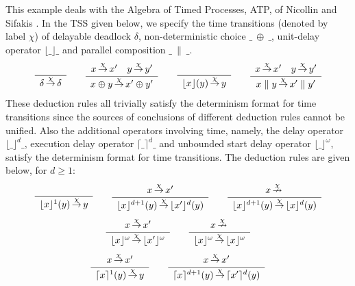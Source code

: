 \begin{example}\label{ex:timetrans1}
This example deals with the Algebra of Timed Processes, ATP, of Nicollin and Sifakis \cite{Nicollin94}.
In the TSS given below, we specify the time transitions (denoted by label $\chi$) of delayable deadlock $\delta$,
non-deterministic choice $\_~\oplus~\_$, unit-delay operator $\lfloor\_\rfloor\_$ and parallel composition $\_~\parallel~\_$.
\[
\sosrule{}{\delta \trans{\chi} \delta}
\qquad
\sosrule{x \trans{\chi} x' \quad y \trans{\chi} y'}{x \oplus y \trans{\chi} x' \oplus y'}
\qquad
\sosrule{}{\lfloor x \rfloor (y) \trans{\chi} y}
\qquad
\sosrule{x \trans{\chi} x' \quad y \trans{\chi} y'}{x \parallel y \trans{\chi} x' \parallel y'}
\]
These deduction rules all trivially satisfy the determinism format for time transitions since the sources of conclusions of different deduction rules cannot be unified. Also the additional operators involving time, namely, the delay operator $\lfloor \_ \rfloor^{d}\_$, execution delay operator
$\lceil \_ \rceil^{d}\_$ and unbounded start delay operator $\lfloor \_ \rfloor^{\omega}$, satisfy the determinism format for time transitions. The deduction rules are given below, for $d \geq 1$:
\[
\sosrule{}{\lfloor x \rfloor^1(y) \trans{\chi} y}
\qquad
\sosrule{x \trans{\chi} x'}{\lfloor x \rfloor^{d+1} (y) \trans{\chi} \lfloor x' \rfloor^{d}(y)}
\qquad
\sosrule{x \ntrans{\chi}}{\lfloor x \rfloor^{d+1} (y) \trans{\chi} \lfloor x \rfloor^{d}(y)}
\]
\[
\sosrule{x \trans{\chi} x'}{\lfloor x \rfloor^{\omega} \trans{\chi} \lfloor x' \rfloor^{\omega}}
\qquad
\sosrule{x \ntrans{\chi}}{\lfloor x \rfloor^{\omega} \trans{\chi} \lfloor x \rfloor^{\omega}}
\]
\[
\sosrule{x \trans{\chi} x'}{\lceil x \rceil^1(y) \trans{\chi} y}
\qquad
\sosrule{x \trans{\chi} x'}{\lceil x \rceil^{d+1} (y) \trans{\chi} \lceil x' \rceil^{d}(y)}
\]
\end{example}

